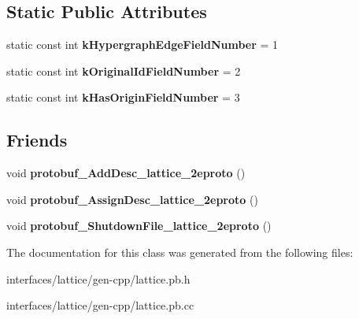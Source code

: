 \subsection*{Static Public Attributes}
\begin{DoxyCompactItemize}
\item 
\hypertarget{classlattice_1_1Origin_a740142917cd1a8dc2db9763c768ea4b1}{
static const int {\bfseries kHypergraphEdgeFieldNumber} = 1}
\label{classlattice_1_1Origin_a740142917cd1a8dc2db9763c768ea4b1}

\item 
\hypertarget{classlattice_1_1Origin_abf5fdc243e613de484e2c64b3ccd0f29}{
static const int {\bfseries kOriginalIdFieldNumber} = 2}
\label{classlattice_1_1Origin_abf5fdc243e613de484e2c64b3ccd0f29}

\item 
\hypertarget{classlattice_1_1Origin_acfa669855c716b2399e9b2949fc38986}{
static const int {\bfseries kHasOriginFieldNumber} = 3}
\label{classlattice_1_1Origin_acfa669855c716b2399e9b2949fc38986}

\end{DoxyCompactItemize}
\subsection*{Friends}
\begin{DoxyCompactItemize}
\item 
\hypertarget{classlattice_1_1Origin_a19e63fb37025879e023cad88064187cf}{
void {\bfseries protobuf\_\-AddDesc\_\-lattice\_\-2eproto} ()}
\label{classlattice_1_1Origin_a19e63fb37025879e023cad88064187cf}

\item 
\hypertarget{classlattice_1_1Origin_a3b0386e09a9fefcf1bdce658cfc480b2}{
void {\bfseries protobuf\_\-AssignDesc\_\-lattice\_\-2eproto} ()}
\label{classlattice_1_1Origin_a3b0386e09a9fefcf1bdce658cfc480b2}

\item 
\hypertarget{classlattice_1_1Origin_a3c7b187721d0704ceb19ff889729d35a}{
void {\bfseries protobuf\_\-ShutdownFile\_\-lattice\_\-2eproto} ()}
\label{classlattice_1_1Origin_a3c7b187721d0704ceb19ff889729d35a}

\end{DoxyCompactItemize}


The documentation for this class was generated from the following files:\begin{DoxyCompactItemize}
\item 
interfaces/lattice/gen-\/cpp/lattice.pb.h\item 
interfaces/lattice/gen-\/cpp/lattice.pb.cc\end{DoxyCompactItemize}
